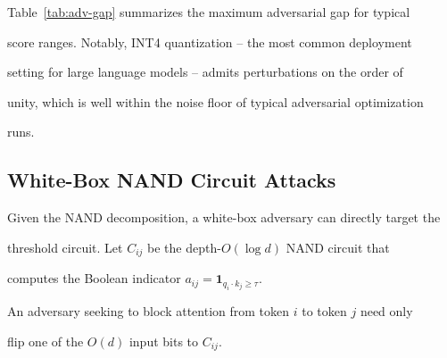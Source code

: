 Table~\ref{tab:adv-gap} summarizes the maximum adversarial gap for typical






score ranges.  Notably, INT4 quantization -- the most common deployment






setting for large language models -- admits perturbations on the order of






unity, which is well within the noise floor of typical adversarial optimization






runs.













\subsection{White-Box NAND Circuit Attacks}













Given the NAND decomposition, a white-box adversary can directly target the






threshold circuit.  Let $C_{ij}$ be the depth-$O(\log d)$ NAND circuit that






computes the Boolean indicator $a_{ij} = \mathbf{1}_{q_i \cdot k_j \geq \tau}$.






An adversary seeking to block attention from token $i$ to token $j$ need only






flip one of the $O(d)$ input bits to $C_{ij}$.













